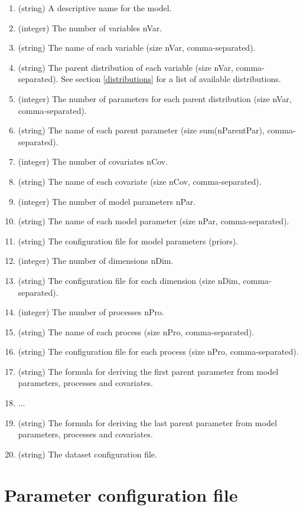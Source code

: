 \documentclass[a4paper]{article}
\begin{document}
	\begin{enumerate}
		\item (string) A descriptive name for the model.
		\item (integer) The number of variables nVar.
		\item (string) The name of each variable (size nVar, comma-separated).
		\item  (string) The parent distribution of each variable (size nVar, comma-separated). See section \ref{distributions} for a list of available distributions.
		\item (integer) The number of parameters for each parent distribution (size nVar, comma-separated).
		\item (string) The name of each parent parameter (size sum(nParentPar), comma-separated).
		\item (integer) The number of covariates nCov.
		\item (string) The name of each covariate (size nCov, comma-separated).
		\item (integer) The number of model parameters nPar.
		\item (string) The name of each model parameter (size nPar, comma-separated).
		\item (string) The configuration file for model parameters (priors).
		\item (integer) The number of dimensions nDim.
		\item (string) The configuration file for each dimension (size nDim, comma-separated).
		\item (integer) The number of processes nPro.
		\item (string) The name of each process (size nPro, comma-separated).
		\item (string) The configuration file for each process (size nPro, comma-separated).
		\item (string) The formula for deriving the first parent parameter from model parameters, processes and covariates. 
		\item ...
		\item (string) The formula for deriving the last parent parameter from model parameters, processes and covariates. 
		\item (string) The dataset configuration file.
	\end{enumerate}
		
	\section{Parameter configuration file}  \label{config_par}
	
\end{document}
